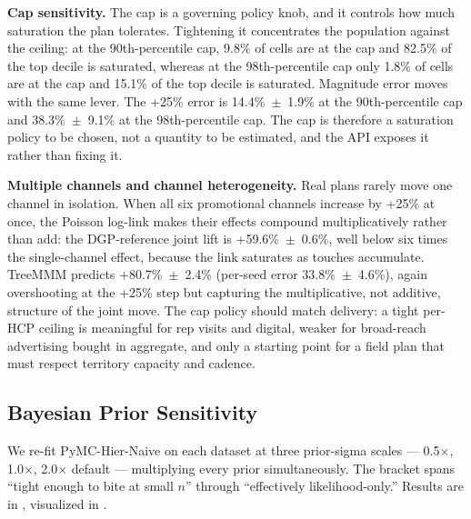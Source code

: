 \documentclass[review,12pt]{elsarticle}
\begin{document}
\textbf{Cap sensitivity.} The cap is a governing policy knob, and it controls
how much saturation the plan tolerates. Tightening it concentrates the
population against the ceiling: at the 90th-percentile cap, 9.8\% of cells are
at the cap and 82.5\% of the top decile is saturated, whereas at the
98th-percentile cap only 1.8\% of cells are at the cap and 15.1\% of the top
decile is saturated. Magnitude error moves with the same lever. The +25\%
error is 14.4\%~$\pm$~1.9\% at the 90th-percentile cap and
38.3\%~$\pm$~9.1\% at the 98th-percentile cap. The cap is therefore a
saturation policy to be chosen, not a quantity to be estimated, and the API
exposes it rather than fixing it.

\textbf{Multiple channels and channel heterogeneity.} Real plans rarely move
one channel in isolation. When all six promotional channels increase by +25\%
at once, the Poisson log-link makes their effects compound multiplicatively
rather than add: the DGP-reference joint lift is +59.6\%~$\pm$~0.6\%, well
below six times the single-channel effect, because the link saturates as
touches accumulate. TreeMMM predicts +80.7\%~$\pm$~2.4\% (per-seed error
33.8\%~$\pm$~4.6\%), again overshooting at the +25\% step but capturing the
multiplicative, not additive, structure of the joint move. The cap policy
should match delivery: a tight per-HCP ceiling is meaningful for rep visits and
digital, weaker for broad-reach advertising bought in aggregate, and only a
starting point for a field plan that must respect territory capacity and
cadence.

\subsection{Bayesian Prior Sensitivity}
\label{sec:results:priors}

We re-fit PyMC-Hier-Naive on each dataset at three prior-sigma scales --- 0.5$\times$,
1.0$\times$, 2.0$\times$ default --- multiplying every prior simultaneously. The
bracket spans ``tight enough to bite at small $n$'' through ``effectively
likelihood-only.'' Results are in , visualized in
.
\end{document}
